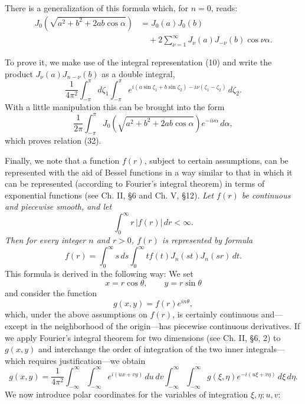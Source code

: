 There is a generalization of this formula which, for $n=0$, reads:
\begin{equation}\tag{32}
\begin{aligned}
J_0\!\left(\sqrt{a^2+b^2+2ab\cos\alpha}\right)
&=J_0(a)J_0(b)\\
&\quad+2\sum_{\nu=1}^{\infty}J_\nu(a)J_{-\nu}(b)\cos\nu\alpha.
\end{aligned}
\end{equation}

To prove it, we make use of the integral representation (10) and write the product $J_\nu(a)J_{n-\nu}(b)$ as a double integral,
\[
\frac{1}{4\pi^2}\int_{-\pi}^{\pi}d\zeta_1\int_{-\pi}^{\pi}
 e^{i(a\sin\zeta_1+b\sin\zeta_2)-i\nu(\zeta_1-\zeta_2)}\,d\zeta_2.
\]
With a little manipulation this can be brought into the form
\[
\frac{1}{2\pi}\int_{-\pi}^{\pi}
J_0\!\left(\sqrt{a^2+b^2+2ab\cos\alpha}\right)e^{-i\nu\alpha}\,d\alpha,
\]
which proves relation (32).

Finally, we note that a function $f(r)$, subject to certain assumptions, can be represented with the aid of Bessel functions in a way similar to that in which it can be represented (according to Fourier's integral theorem) in terms of exponential functions (see Ch. II, \S6 and Ch. V, \S12). \emph{Let $f(r)$ be continuous and piecewise smooth, and let}
\[
\int_0^\infty r\,|f(r)|\,dr<\infty.
\]
\emph{Then for every integer $n$ and $r>0$, $f(r)$ is represented by formula}
\begin{equation}\tag{33}
 f(r)=\int_0^\infty s\,ds\int_0^\infty t f(t)J_n(st)J_n(sr)\,dt.
\end{equation}
This formula is derived in the following way: We set
\[
x=r\cos\theta,\qquad y=r\sin\theta
\]
and consider the function
\[
g(x,y)=f(r)e^{in\theta},
\]
which, under the above assumptions on $f(r)$, is certainly continuous and---except in the neighborhood of the origin---has piecewise continuous derivatives. If we apply Fourier's integral theorem for two dimensions (see Ch. II, \S6, 2) to $g(x,y)$ and interchange the order of integration of the two inner integrals---which requires justification---we obtain
\[
g(x,y)=\frac1{4\pi^2}\int_{-\infty}^{\infty}\int_{-\infty}^{\infty}
 e^{i(ux+vy)}\,du\,dv
 \int_{-\infty}^{\infty}\int_{-\infty}^{\infty}
 g(\xi,\eta)e^{-i(u\xi+v\eta)}\,d\xi\,d\eta.
\]
We now introduce polar coordinates for the variables of integration $\xi,\eta;u,v$:

